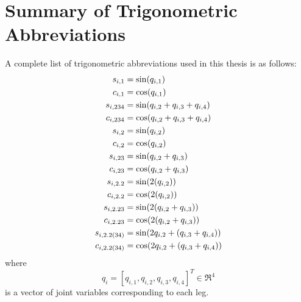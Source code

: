\chapter{Summary of Trigonometric Abbreviations}
	\label{appendix::e}

	\noident
	A complete list of trigonometric abbreviations used in this thesis is as follows:
		\begin{equation*}
			\begin{split}\small
				s_{i,1} 	&= \sin(q_{i,1})					\\
				c_{i,1} 	&= \cos(q_{i,1})					\\
				s_{i,234} 	&= \sin(q_{i,2}+q_{i,3}+q_{i,4})	\\
				c_{i,234} 	&= \cos(q_{i,2}+q_{i,3}+q_{i,4})	\\
				s_{i,2} 	&= \sin(q_{i,2})					\\
				c_{i,2} 	&= \cos(q_{i,2})					\\
				s_{i,23} 	&= \sin(q_{i,2}+q_{i,3})			\\
				c_{i,23} 	&= \cos(q_{i,2}+q_{i,3})			\\
				s_{i,2.2} 	&= \sin(2(q_{i,2}))					\\
				c_{i,2.2} 	&= \cos(2(q_{i,2}))					\\
				s_{i,2.23} 	&= \sin(2(q_{i,2}+q_{i,3}))			\\
				c_{i,2.23} 	&= \cos(2(q_{i,2}+q_{i,3}))			\\
				s_{i,2.2(34)}&= \sin(2q_{i,2}+(q_{i,3}+q_{i,4}))	\\
				c_{i,2.2(34)}&= \cos(2q_{i,2}+(q_{i,3}+q_{i,4}))	\\
			\end{split}
		\end{equation*}
	where 
		\begin{equation*}
			q_{i} = [q_{i,1},q_{i,2},q_{i,3},q_{i,4}]^{T} \in \Re^{4} 
		\end{equation*}
	is a vector of joint variables corresponding to each \Ith leg.